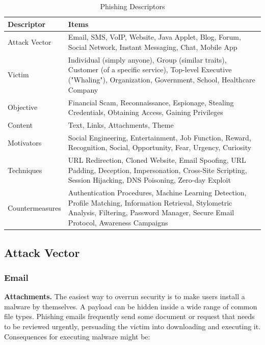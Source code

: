 \documentclass[a4paper]{article}
\begin{document}
\bigskip

\begingroup
\renewcommand{\arraystretch}{1.15}
\begin{table}[ht!]
\begin{center}
    \begin{tabular}{ | p{3cm} | p{8cm} | }
    \hline
    \textbf{Descriptor} & \textbf{Items} \\ \hline
    Attack Vector & Email, SMS, VoIP, Website, Java Applet, Blog, Forum, Social Network, Instant Messaging, Chat, Mobile App \\ \hline
    Victim & Individual (simply anyone), Group (similar traits), Customer (of a specific service), Top-level Executive ("Whaling"), Organization, Government, School, Healthcare Company \\ \hline
    Objective & Financial Scam, Reconnaissance, Espionage, Stealing Credentials, Obtaining Access, Gaining Privileges \\ \hline
    Content & Text, Links, Attachments, Theme \\ \hline
    Motivators & Social Engineering, Entertainment, Job Function, Reward, Recognition, Social, Opportunity, Fear, Urgency, Curiosity \\ \hline
    Techniques & URL Redirection, Cloned Website, Email Spoofing, URL Padding, Deception, Impersonation, Cross-Site Scripting, Session Hijacking, DNS Poisoning, Zero-day Exploit \\ \hline
    Countermeasures & Authentication Procedures, Machine Learning Detection, Profile Matching, Information Retrieval, Stylometric Analysis, Filtering, Password Manager, Secure Email Protocol, Awareness Campaigns \\ \hline
    \end{tabular}
\end{center}
\caption{Phishing Descriptors}
\label{tb-descriptors}
\end{table}
\endgroup

\subsection{Attack Vector}

\subsubsection{Email}

\textbf{Attachments.} The easiest way to overrun security is to make users install a malware by themselves. A payload can be hidden inside a wide range of common file types. Phishing emails frequently send some document or request that needs to be reviewed urgently, persuading the victim into downloading and executing it. Consequences for executing malware might be:
\end{document}
